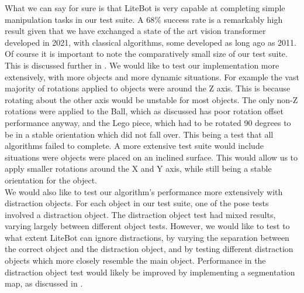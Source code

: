 What we can say for sure is that LiteBot is very capable at completing simple manipulation tasks in our test suite. A 68\% success rate is a remarkably high result given that we have exchanged a state of the art vision transformer developed in 2021, with classical algorithms, some developed as long ago as 2011. Of course it is important to note the comparatively small size of our test suite. This is discussed further in . We would like to test our implementation more extensively, with more objects and more dynamic situations. For example the vast majority of rotations applied to objects were around the Z axis. This is because rotating about the other axis would be unstable for most objects. The only non-Z rotations were applied to the Ball, which as discussed has poor rotation offset performance anyway, and the Lego piece, which had to be rotated 90 degrees to be in a stable orientation which did not fall over. This being a test that all algorithms failed to complete. A more extensive test suite would include situations were objects were placed on an inclined surface. This would allow us to apply smaller rotations around the X and Y axis, while still being a stable orientation for the object.\\

We would also like to test our algorithm's performance more extensively with distraction objects. For each object in our test suite, one of the pose tests involved a distraction object. The distraction object test had mixed results, varying largely between different object tests. However, we would like to test to what extent LiteBot can ignore distractions, by varying the separation between the correct object and the distraction object, and by testing different distraction objects which more closely resemble the main object. Performance in the distraction object test would likely be improved by implementing a segmentation map, as discussed in .

